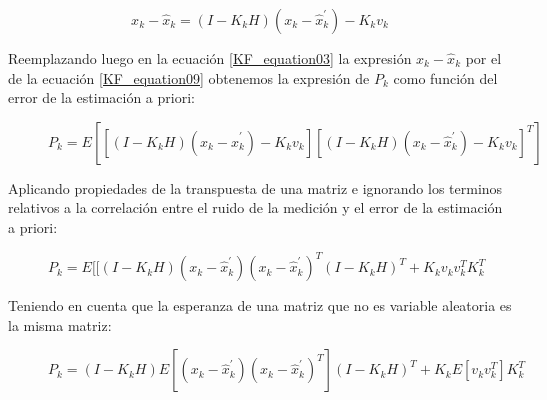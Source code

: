 \documentclass[10pt,a4paper]{article}
\begin{document}
\begin{figure}[h!]
	\begin{center}
		\begin{equation}
		x_k - \hat{x}_k = (I-K_k H)(x_k - \hat{x}^\prime_k) - K_kv_{k}
		\label{KF_equation09}
		\end{equation}	
	\end{center}
\end{figure}


Reemplazando luego en la ecuación \ref{KF_equation03} la expresión $x_k - \hat{x}_k$  por el de la ecuación \ref{KF_equation09} obtenemos la expresión de $P_k$ como función del error de la estimación a priori:

\begin{figure}[h!]
	\begin{center}
		\begin{equation}
	P_k = E[[(I-K_k H)(x_k - \hat{x}^\prime_k) - K_kv_{k}][ (I-K_k H)(x_k - \hat{x}^\prime_k) - K_kv_{k}]^T]
		\label{KF_equation10}
		\end{equation}	
	\end{center}
\end{figure}

Aplicando propiedades de la transpuesta de una matriz e ignorando los terminos relativos a la correlación entre el ruido de la medición y el error de la estimación a priori:

\begin{figure}[h!]
	\begin{center}
		\begin{equation}
		P_k = E[[(I-K_k H)(x_k - \hat{x}^\prime_k)(x_k - \hat{x}^\prime_k)^T(I-K_k H)^T + K_k v_{k} v_{k}^T K_k^T 
		\label{KF_equation11}
		\end{equation}	
	\end{center}
\end{figure}


Teniendo en cuenta que la esperanza de una matriz que no es variable aleatoria es la misma matriz:

\begin{figure}[h!]
	\begin{center}
		\begin{equation}
		P_k = (I-K_k H) E[(x_k - \hat{x}^\prime_k)(x_k - \hat{x}^\prime_k)^T](I-K_k H)^T + K_k E[v_{k} v_{k}^T] K_k^T 
		\label{KF_equation12}
		\end{equation}	
	\end{center}
\end{figure}
\end{document}

